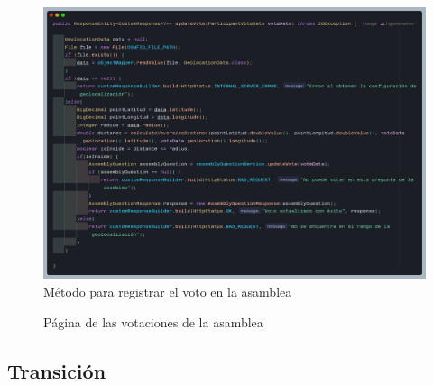 \begin{figure}[H]
    \centering
    \includegraphics[width=1\textwidth]{resources/images/api-votacion-metodo}
    \caption{Método para registrar el voto en la asamblea}
    \label{fig:api-votacion-codigo}
\end{figure}

\begin{figure}[H]
    \centering
    \caption{Página de las votaciones de la asamblea}
    \label{fig:api-vote}
\end{figure}

\subsection{Transición}\label{subsec:transicion}

